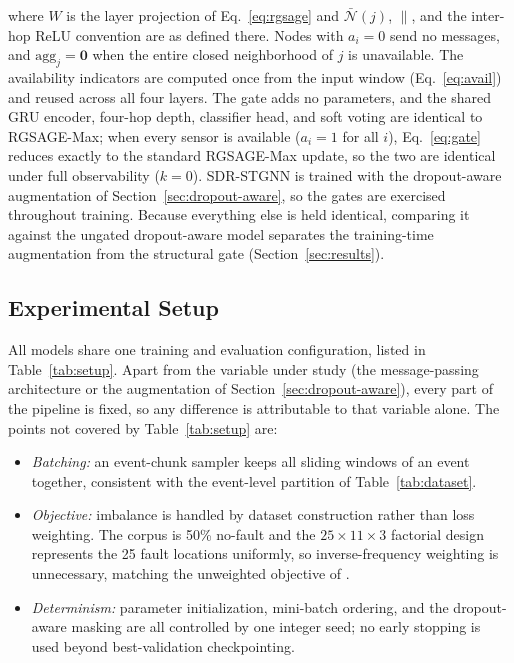 \documentclass[3p,times,procedia]{elsarticle}
\begin{document}
where $W$ is the layer projection of Eq.~\eqref{eq:rgsage} and $\bar{\mathcal N}(j)$, $\|$, and the inter-hop ReLU convention are as defined there. Nodes with $a_i=0$ send no messages, and $\mathrm{agg}_j=\mathbf{0}$ when the entire closed neighborhood of $j$ is unavailable. The availability indicators are computed once from the input window (Eq.~\eqref{eq:avail}) and reused across all four layers. The gate adds no parameters, and the shared GRU encoder, four-hop depth, classifier head, and soft voting are identical to RGSAGE-Max; when every sensor is available ($a_i=1$ for all $i$), Eq.~\eqref{eq:gate} reduces exactly to the standard RGSAGE-Max update, so the two are identical under full observability ($k=0$). SDR-STGNN is trained with the dropout-aware augmentation of Section~\ref{sec:dropout-aware}, so the gates are exercised throughout training. Because everything else is held identical, comparing it against the ungated dropout-aware model separates the training-time augmentation from the structural gate (Section~\ref{sec:results}).

\subsection{Experimental Setup}
\label{sec:setup}

All models share one training and evaluation configuration, listed in Table~\ref{tab:setup}. Apart from the variable under study (the message-passing architecture or the augmentation of Section~\ref{sec:dropout-aware}), every part of the pipeline is fixed, so any difference is attributable to that variable alone. The points not covered by Table~\ref{tab:setup} are:

\begin{itemize}
  \item \emph{Batching:} an event-chunk sampler keeps all sliding windows of an event together, consistent with the event-level partition of Table~\ref{tab:dataset}.
  \item \emph{Objective:} imbalance is handled by dataset construction rather than loss weighting. The corpus is 50\% no-fault and the $25\times11\times3$ factorial design represents the 25 fault locations uniformly, so inverse-frequency weighting is unnecessary, matching the unweighted objective of \cite{Karabulut2026}.
  \item \emph{Determinism:} parameter initialization, mini-batch ordering, and the dropout-aware masking are all controlled by one integer seed; no early stopping is used beyond best-validation checkpointing.
\end{itemize}
\end{document}
